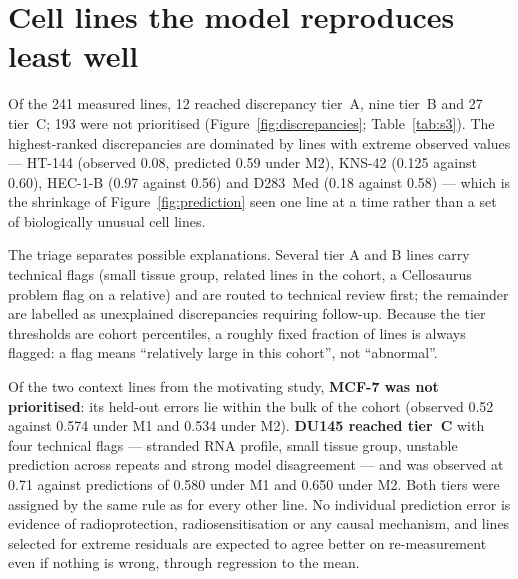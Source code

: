 \section{Cell lines the model reproduces least well}\label{sec:discrepancies}

Of the 241 measured lines, 12 reached discrepancy tier~A, nine tier~B and 27 tier~C; 193 were
not prioritised (Figure~\ref{fig:discrepancies}; Table~\ref{tab:s3}). The highest-ranked
discrepancies are dominated by lines with extreme observed values --- HT-144 (observed 0.08,
predicted 0.59 under M2), KNS-42 (0.125 against 0.60), HEC-1-B (0.97 against 0.56) and
D283~Med (0.18 against 0.58) --- which is the shrinkage of Figure~\ref{fig:prediction} seen one line at a time
rather than a set of biologically unusual cell lines.

The triage separates possible explanations. Several tier A and B lines carry technical flags
(small tissue group, related lines in the cohort, a Cellosaurus problem flag on a relative)
and are routed to technical review first; the remainder are labelled as unexplained
discrepancies requiring follow-up. Because the tier thresholds are cohort percentiles, a
roughly fixed fraction of lines is always flagged: a flag means \enquote{relatively large in
this cohort}, not \enquote{abnormal}.

Of the two context lines from the motivating study, \textbf{MCF-7 was not prioritised}: its
held-out errors lie within the bulk of the cohort (observed 0.52 against 0.574 under M1 and
0.534 under M2). \textbf{DU145 reached tier~C} with four technical flags --- stranded RNA
profile, small tissue group, unstable prediction across repeats and strong model
disagreement --- and was observed at 0.71 against predictions of 0.580 under M1 and 0.650
under M2. Both tiers were assigned by the same rule as for every other line. No individual
prediction error is evidence of radioprotection, radiosensitisation or any causal mechanism,
and lines selected for extreme residuals are expected to agree better on re-measurement even
if nothing is wrong, through regression to the mean.

